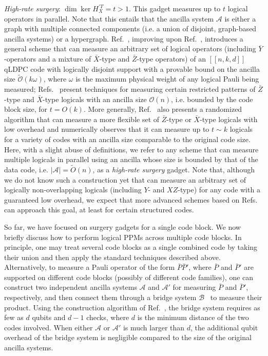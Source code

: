 \documentclass[reprint,twocolumn,secnumarabic,amssymb, aps, prx]{revtex4-2}
\begin{document}
\emph{High-rate surgery}: $\dim \ker H_X^{\prime T} = t > 1$. This gadget measures up to $t$ logical operators in parallel. Note that this entails that the ancilla system $\mathcal{A}$ is either a graph with multiple connected components (i.e. a union of disjoint, graph-based ancilla systems) or a hypergraph. Ref.~\cite{cowtan2025parallel}, improving upon Ref.~\cite{zhang2025time}, introduces a general scheme that can measure an arbitrary set of logical operators (including $\overline{Y}$-operators and a mixture of $\bar{X}$-type and $\bar{Z}$-type operators) of an $[[n,k,d]]$ qLDPC code with logically disjoint support with a provable bound on the ancilla size $\tilde{\mathcal{O}}(k\omega)$, where $\omega$ is the maximum physical weight of any logical Pauli being measured; Refs.~\cite{zheng2025high, cowtan2025fast, chang2026constant, gu2026qgpuparallellogicquantum} present techniques for measuring certain restricted patterns of $\bar{Z}$-type and $\bar{X}$-type logicals with an ancilla size $\mathcal{O}(n)$, i.e. bounded by the code block size, for $t = O(k)$. More generally, Ref.~\cite{zheng2025high} also presents a randomized algorithm that can measure a more flexible set of $\bar{Z}$-type or $\bar{X}$-type logicals with low overhead and numerically observes that it can measure up to $t \sim k$ logicals for a variety of codes with an ancilla size comparable to the original code size. Here, with a slight abuse of definitions, we refer to any scheme that can measure multiple logicals in parallel using an ancilla whose size is bounded by that of the data code, i.e. $|\mathcal{A}| = \tilde{O}(n)$, as a \emph{high-rate surgery} gadget. Note that, although we do not know such a construction yet that can measure an arbitrary set of logically non-overlapping logicals (including $Y$- and $XZ$-type) for any code with a guaranteed low overhead, we expect that more advanced schemes based on Refs.~\cite{zheng2025high, gu2026qgpuparallellogicquantum, chang2026constant, zheng2026high} can approach this goal, at least for certain structured codes.

So far, we have focused on surgery gadgets for a single code block. We now briefly discuss how to perform logical PPMs across multiple code blocks. In principle, one may treat several code blocks as a single combined code by taking their union and then apply the standard techniques described above. Alternatively, to measure a Pauli operator of the form $\bar{P}\bar{P}'$, where $\bar{P}$ and $\bar{P}'$ are supported on different code blocks (possibly of different code families), one can construct two independent ancilla systems $\mathcal{A}$ and $\mathcal{A}'$ for measuring $\bar{P}$ and $\bar{P}'$, respectively, and then connect them through a bridge system $\mathcal{B}$~\cite{cross2024improved, swaroop2024universal} to measure their product. Using the construction algorithm of Ref.~\cite{swaroop2024universal}, the bridge system requires as few as $d$ qubits and $d-1$ checks, where $d$ is the minimum distance of the two codes involved. When either $\mathcal{A}$ or $\mathcal{A}'$ is much larger than $d$, the additional qubit overhead of the bridge system is negligible compared to the size of the original ancilla systems.
\end{document}

